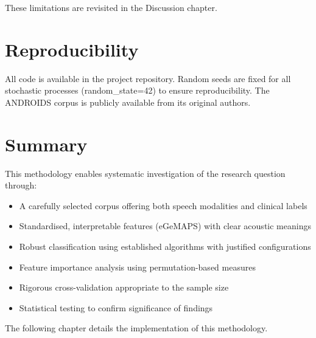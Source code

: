 These limitations are revisited in the Discussion chapter.

\section{Reproducibility}

All code is available in the project repository. Random seeds are fixed for all stochastic processes (random\_state=42) to ensure reproducibility. The ANDROIDS corpus is publicly available from its original authors.

\section{Summary}

This methodology enables systematic investigation of the research question through:

\begin{itemize}
    \item A carefully selected corpus offering both speech modalities and clinical labels
    \item Standardised, interpretable features (eGeMAPS) with clear acoustic meanings
    \item Robust classification using established algorithms with justified configurations
    \item Feature importance analysis using permutation-based measures
    \item Rigorous cross-validation appropriate to the sample size
    \item Statistical testing to confirm significance of findings
\end{itemize}

The following chapter details the implementation of this methodology.
